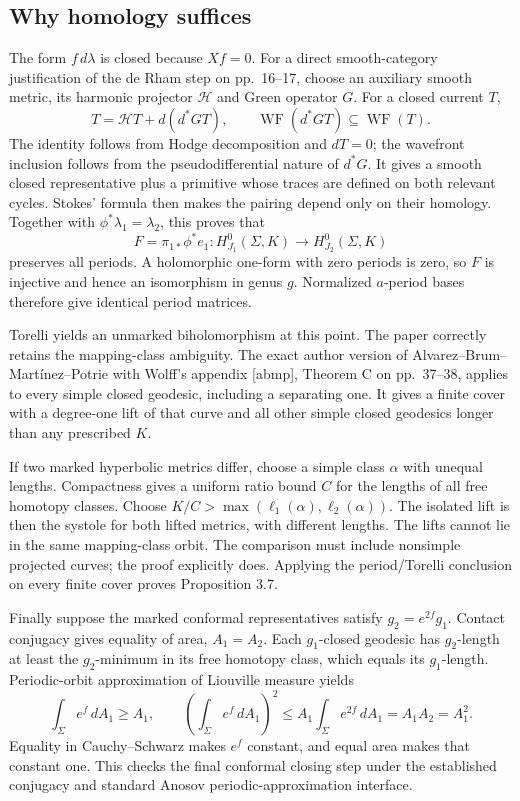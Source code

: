 \documentclass[10pt]{article}
\begin{document}
\subsection*{Why homology suffices}
The form \(f\,d\lambda\) is closed because \(Xf=0\). For a direct smooth-category justification of the de Rham step on pp. 16–17, choose an auxiliary smooth metric, its harmonic projector \(\mathcal{H}\) and Green operator \(G\). For a closed current \(T\), \[T=\mathcal{H}T+d(d^*GT),\qquad
 \operatorname{WF}(d^*GT)\subseteq\operatorname{WF}(T).\] The identity follows from Hodge decomposition and \(dT=0\); the wavefront inclusion follows from the pseudodifferential nature of \(d^*G\). It gives a smooth closed representative plus a primitive whose traces are defined on both relevant cycles. Stokes’ formula then makes the pairing depend only on their homology. Together with \(\phi^*\lambda_1=\lambda_2\), this proves that \[F=\pi_{1*}\phi^*e_1:
 H^0_{J_1}(\Sigma,K)\longrightarrow H^0_{J_2}(\Sigma,K)\] preserves all periods. A holomorphic one-form with zero periods is zero, so \(F\) is injective and hence an isomorphism in genus \(g\). Normalized \(a\)-period bases therefore give identical period matrices.\par
Torelli yields an unmarked biholomorphism at this point. The paper correctly retains the mapping-class ambiguity. The exact author version of Alvarez–Brum–Martínez–Potrie with Wolff’s appendix [abmp], Theorem C on pp. 37–38, applies to every simple closed geodesic, including a separating one. It gives a finite cover with a degree-one lift of that curve and all other simple closed geodesics longer than any prescribed \(K\).\par
If two marked hyperbolic metrics differ, choose a simple class \(\alpha\) with unequal lengths. Compactness gives a uniform ratio bound \(C\) for the lengths of all free homotopy classes. Choose \(K/C>\max(\ell_1(\alpha),\ell_2(\alpha))\). The isolated lift is then the systole for both lifted metrics, with different lengths. The lifts cannot lie in the same mapping-class orbit. The comparison must include nonsimple projected curves; the proof explicitly does. Applying the period/Torelli conclusion on every finite cover proves Proposition 3.7.\par
Finally suppose the marked conformal representatives satisfy \(g_2=e^{2f}g_1\). Contact conjugacy gives equality of area, \(A_1=A_2\). Each \(g_1\)-closed geodesic has \(g_2\)-length at least the \(g_2\)-minimum in its free homotopy class, which equals its \(g_1\)-length. Periodic-orbit approximation of Liouville measure yields \[\int_\Sigma e^f\,dA_1\ge A_1,\qquad
 \left(\int_\Sigma e^f\,dA_1\right)^2
 \le A_1\int_\Sigma e^{2f}\,dA_1=A_1A_2=A_1^2.\] Equality in Cauchy–Schwarz makes \(e^f\) constant, and equal area makes that constant one. This checks the final conformal closing step under the established conjugacy and standard Anosov periodic-approximation interface.\par
\end{document}
